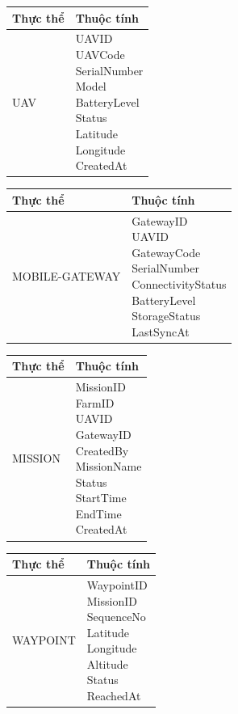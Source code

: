 \begin{longtable}{p{}p{}}
\toprule
\textbf{Thực thể} & \textbf{Thuộc tính} \\
\midrule
UAV & \makecell[l]{UAVID \\UAVCode \\SerialNumber \\Model \\BatteryLevel \\Status \\Latitude \\Longitude \\CreatedAt} \\
\bottomrule
\end{longtable}


\begin{longtable}{p{}p{}}
\toprule
\textbf{Thực thể} & \textbf{Thuộc tính} \\
\midrule
MOBILE-GATEWAY & \makecell[l]{GatewayID \\UAVID \\GatewayCode \\SerialNumber \\ConnectivityStatus \\BatteryLevel \\StorageStatus \\LastSyncAt} \\
\bottomrule
\end{longtable}


\begin{longtable}{p{}p{}}
\toprule
\textbf{Thực thể} & \textbf{Thuộc tính} \\
\midrule
MISSION & \makecell[l]{MissionID \\FarmID \\UAVID \\GatewayID \\CreatedBy \\MissionName \\Status \\StartTime \\EndTime \\CreatedAt} \\
\bottomrule
\end{longtable}


\begin{longtable}{p{}p{}}
\toprule
\textbf{Thực thể} & \textbf{Thuộc tính} \\
\midrule
WAYPOINT & \makecell[l]{WaypointID \\MissionID \\SequenceNo \\Latitude \\Longitude \\Altitude \\Status \\ReachedAt} \\
\bottomrule
\end{longtable}


